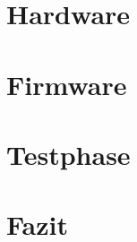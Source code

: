 \documentclass{fhnwreport/fhnwreport}
\begin{document}
\clearpage
\section{Hardware}
\label{sec:hardware}



\clearpage
\section{Firmware}
\label{sec:firmware}



\clearpage
\section{Testphase}
\label{sec:testphase}



\clearpage
\section{Fazit}
\label{sec:fazit}



%



%
\end{document}
